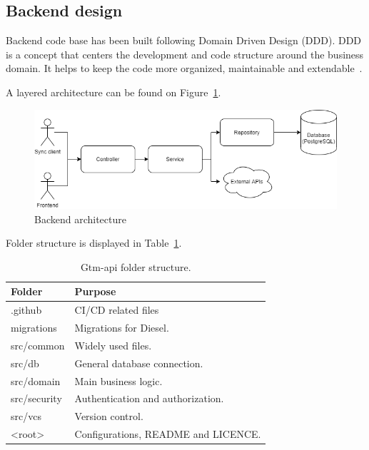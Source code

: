 \subsection{Backend design}\label{subsec:backend-design}
Backend code base has been built following Domain Driven Design (DDD).
DDD is a concept that centers the development and code structure around the business domain.
It helps to keep the code more organized, maintainable and extendable~\cite{domain-driven-design}.

A layered architecture can be found on Figure~\ref{fig:backend-layered-diagram}.
\begin{figure}[H]
    \includegraphics[width=\textwidth]{figures/backend_layered_diagram}
    \caption{Backend architecture}
    \label{fig:backend-layered-diagram}
\end{figure}

Folder structure is displayed in Table~\ref{tab:gtm-api-folder-structure}.
\begin{table}[h]
    \centering
    \begin{tabular}{ | p{3cm} | p{10cm} |}
        \hline
        \textbf{Folder} & \textbf{Purpose}\\
        \hline
        .github & CI/CD related files\\
        \hline
        migrations & Migrations for Diesel. \\
        \hline
        src/common & Widely used files.\\
        \hline
        src/db & General database connection.\\
        \hline
        src/domain & Main business logic.\\
        \hline
        src/security & Authentication and authorization.\\
        \hline
        src/vcs & Version control.\\
        \hline
        <root> & Configurations, README and LICENCE.\\
        \hline
    \end{tabular}
    \caption{Gtm-api folder structure.}
    \label{tab:gtm-api-folder-structure}
\end{table}

